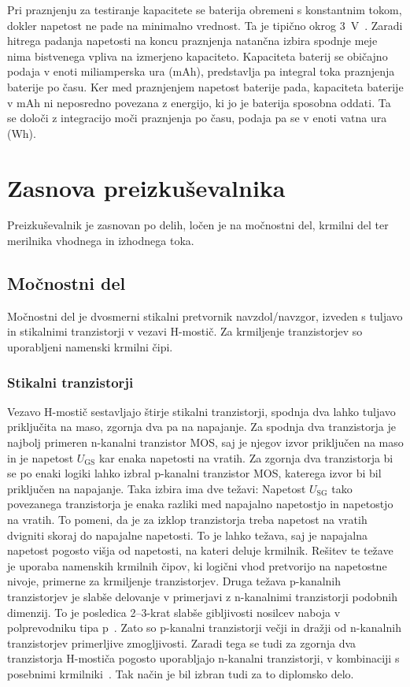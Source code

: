 \documentclass[a4paper,twoside,openright,12pt,slovene]{book}
\begin{document}
Pri praznjenju za testiranje kapacitete se baterija obremeni s konstantnim tokom, dokler napetost ne pade na minimalno vrednost.
Ta je tipično okrog 3~V~\cite{meena_charging_2014}.
Zaradi hitrega padanja napetosti na koncu praznjenja natančna izbira spodnje meje nima bistvenega vpliva na izmerjeno kapaciteto.
Kapaciteta baterij se običajno podaja v enoti miliamperska ura (mAh), predstavlja pa integral toka praznjenja baterije po času.
Ker med praznjenjem napetost baterije pada, kapaciteta baterije v mAh ni neposredno povezana z energijo, ki jo je baterija sposobna oddati.
Ta se določi z integracijo moči praznjenja po času, podaja pa se v enoti vatna ura (Wh).

\chapter{Zasnova preizkuševalnika} \label{ch:zasnova_preizkusevalnika}

Preizkuševalnik je zasnovan po delih, ločen je na močnostni del, krmilni del ter merilnika vhodnega in izhodnega toka.

\section{Močnostni del} \label{sec:mocnostni_del}
Močnostni del je dvosmerni stikalni pretvornik navzdol/navzgor,
izveden s tuljavo in stikalnimi tranzistorji v vezavi H-mostič.
Za krmiljenje tranzistorjev so uporabljeni namenski krmilni čipi.

\subsection{Stikalni tranzistorji} \label{subsec:stikalni_tranzistorji}
Vezavo H-mostič sestavljajo štirje stikalni tranzistorji, spodnja dva lahko tuljavo priključita na maso, zgornja dva pa na napajanje.
Za spodnja dva tranzistorja je najbolj primeren n-kanalni tranzistor MOS, saj je njegov izvor priključen na maso in je napetost $U_\mathrm{GS}$ kar enaka napetosti na vratih.
Za zgornja dva tranzistorja bi se po enaki logiki lahko izbral p-kanalni tranzistor MOS, katerega izvor bi bil priključen na napajanje.
Taka izbira ima dve težavi: Napetost $U_\mathrm{SG}$ tako povezanega tranzistorja je enaka razliki med napajalno napetostjo in napetostjo na vratih.
To pomeni, da je za izklop tranzistorja treba napetost na vratih dvigniti skoraj do napajalne napetosti.
To je lahko težava, saj je napajalna napetost pogosto višja od napetosti, na kateri deluje krmilnik.
Rešitev te težave je uporaba namenskih krmilnih čipov, ki logični vhod pretvorijo na napetostne nivoje, primerne za krmiljenje tranzistorjev.
Druga težava p-kanalnih tranzistorjev je slabše delovanje v primerjavi z n-kanalnimi tranzistorji podobnih dimenzij.
To je posledica 2--3-krat slabše gibljivosti nosilcev naboja v polprevodniku tipa p~\cite{cheroff_igfet_1969}.
Zato so p-kanalni tranzistorji večji in dražji od n-kanalnih tranzistorjev primerljive zmogljivosti.
Zaradi tega se tudi za zgornja dva tranzistorja H-mostiča pogosto uporabljajo n-kanalni tranzistorji, v kombinaciji s posebnimi krmilniki~\cite{javadian_reliability_2013}.
Tak način je bil izbran tudi za to diplomsko delo.
\end{document}
